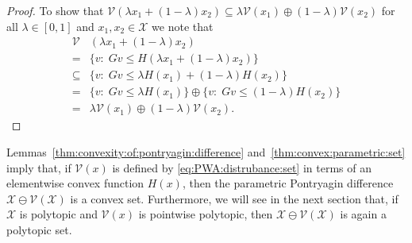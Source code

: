 \documentclass[letterpaper, 10pt, conference]{ieeeconf} %
\newtheorem{thm}{Lemma}[section]
\begin{document}
%
    \begin{proof}
      To show that $\mathcal V(\lambda x_1 + (1-\lambda)x_2)\subseteq 
      \lambda\mathcal V(x_1) \oplus(1-\lambda)\mathcal V(x_2)$ for all $\lambda \in [0,1]$ and $x_1, x_2\in\mathcal X$ we note that
        \begin{align*}
        \mathcal V&(\lambda x_1 + (1-\lambda)x_2)\\
        =& \{v:\; G v \leq H(\lambda x_1 + (1-\lambda)x_2)\}\\
        \subseteq& \{v:\;Gv\leq\lambda H(x_1)+(1-\lambda) H(x_2)\}\\
        =&\{v:\;Gv\leq\lambda H(x_1)\}\oplus\{v
        :\;Gv\leq(1-\lambda)H(x_2)\}\\
        =&\lambda\mathcal V(x_1)\oplus(1-\lambda)\mathcal V(x_2).
        \end{align*}
\baselineskip
    \end{proof} 
%
%
\def\genmat{\Xi} \def\genvec{\xi}
%
Lemmas~\ref{thm:convexity:of:pontryagin:difference} 
and~\ref{thm:convex:parametric:set} imply that, if $\mathcal V(x)$ is defined by \eqref{eq:PWA:distrubance:set} in terms of an elementwise convex function $H(x)$, then the parametric Pontryagin difference $\mathcal X\ominus \mathcal V(\mathcal X)$
is a convex set.
Furthermore, we will see in the next section that, if $\mathcal X$ is polytopic and $\mathcal 
V(x)$ is pointwise polytopic, then $\mathcal X\ominus\mathcal V(\mathcal X)$ is 
again a polytopic set. 
%
%
%
%
\end{document}
